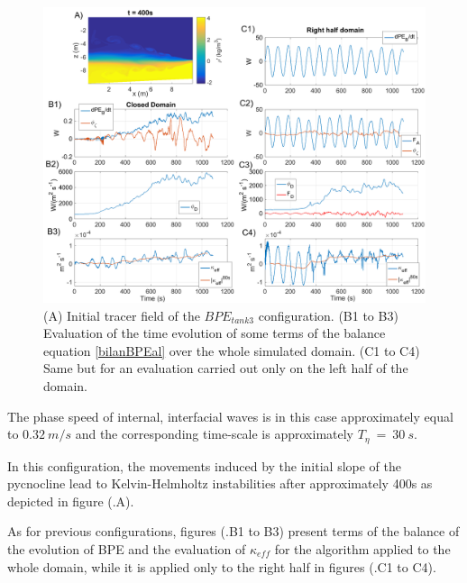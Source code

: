 \begin{figure}[h!]
\includegraphics[width=1.\textwidth]{./CHAP_BPE/Fig_TANK_pycbath2.png}
\caption[Initial tracer field and evaluation of $\kappa_{eff}$ for configuration $BPE_{tank3}$]{(A) Initial tracer field of the $BPE_{tank3}$ configuration. (B1 to B3) Evaluation of the time evolution of some terms of the balance equation \ref{bilanBPEal} over the whole simulated domain. (C1 to C4) Same but for an evaluation carried out only on the left half of the domain.}
\label{figCbath}
\end{figure}
The phase speed of internal, interfacial waves is in this case approximately equal to $0.32\ m/s$ and the corresponding time-scale is approximately $T_{\eta}\ =\ 30\ s$.

In this configuration, the movements induced by the initial slope of the pycnocline lead to Kelvin-Helmholtz instabilities after approximately 400s as depicted in figure (.A).

As for previous configurations, figures (.B1 to B3) present terms of the balance of the evolution of BPE and the evaluation of $\kappa_{eff}$ for the algorithm applied to the whole domain, while it is applied only to the right half in figures (.C1 to C4).

